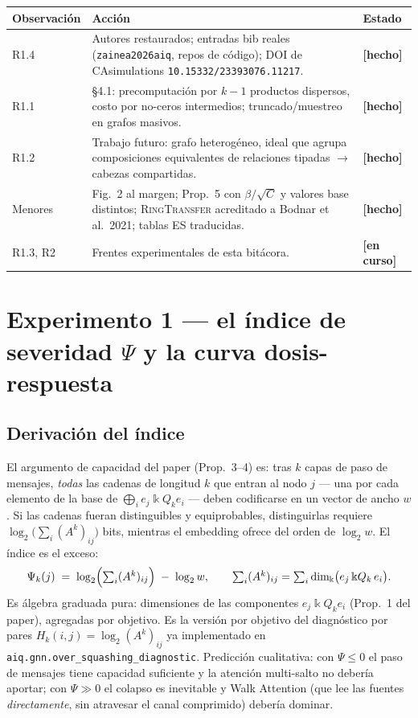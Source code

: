 \documentclass[11pt]{article}
\newcommand{\estado}[1]{\textcolor{blue!60!black}{\textbf{[#1]}}}
\newcommand{\kk}{\Bbbk}
\newcommand{\kQ}{\kk Q}
\begin{document}
\begin{center}\small
\begin{tabular}{p{3.6cm}p{9.4cm}l}
\toprule
\textbf{Observaci\'on} & \textbf{Acci\'on} & \textbf{Estado}\\
\midrule
R1.4 & Autores restaurados; entradas bib reales
(\texttt{zainea2026aiq}, repos de c\'odigo); DOI de CAsimulations
\texttt{10.15332/23393076.11217}. & \estado{hecho}\\
R1.1 & \S4.1: precomputaci\'on por $k{-}1$ productos dispersos, costo por
no-ceros intermedios; truncado/muestreo en grafos masivos. & \estado{hecho}\\
R1.2 & Trabajo futuro: grafo heterog\'eneo, ideal que agrupa composiciones
equivalentes de relaciones tipadas $\to$ cabezas compartidas. & \estado{hecho}\\
Menores & Fig.~2 al margen; Prop.~5 con $\beta/\sqrt{C}$ y valores base
distintos; \textsc{RingTransfer} acreditado a Bodnar et al.\ 2021; tablas ES
traducidas. & \estado{hecho}\\
R1.3, R2 & Frentes experimentales de esta bit\'acora. & \estado{en curso}\\
\bottomrule
\end{tabular}
\end{center}

\section{Experimento 1 --- el \'indice de severidad $\Psi$ y la curva
dosis-respuesta}

\subsection{Derivaci\'on del \'indice}

El argumento de capacidad del paper (Prop.~3--4) es: tras $k$ capas de paso
de mensajes, \emph{todas} las cadenas de longitud $k$ que entran al nodo $j$
--- una por cada elemento de la base de $\bigoplus_i e_j\kQ_k e_i$ --- deben
codificarse en un vector de ancho $w$. Si las cadenas fueran distinguibles y
equiprobables, distinguirlas requiere $\log_2\bigl(\sum_i(A^k)_{ij}\bigr)$
bits, mientras el embedding ofrece del orden de $\log_2 w$. El \'indice es el
exceso:
\[
\Psi_k(j)\;=\;\log_2\Bigl(\textstyle\sum_i (A^k)_{ij}\Bigr)\;-\;\log_2 w,
\qquad
\sum_i (A^k)_{ij}=\sum_i \dim_\kk\bigl(e_j\,\kQ_k\,e_i\bigr).
\]
Es \'algebra graduada pura: dimensiones de las componentes $e_j\kQ_k e_i$
(Prop.~1 del paper), agregadas por objetivo. Es la versi\'on por objetivo del
diagn\'ostico por pares $H_k(i,j)=\log_2(A^k)_{ij}$ ya implementado en
\texttt{aiq.gnn.over\_squashing\_diagnostic}. Predicci\'on cualitativa: con
$\Psi\le0$ el paso de mensajes tiene capacidad suficiente y la atenci\'on
multi-salto no deber\'ia aportar; con $\Psi\gg0$ el colapso es inevitable y
Walk Attention (que lee las fuentes \emph{directamente}, sin atravesar el
canal comprimido) deber\'ia dominar.
\end{document}
